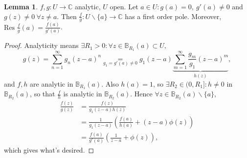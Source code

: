 \documentclass[a4paper]{article}
\theoremstyle{definition}
\newtheorem{lemma}[defn]{Lemma}
\begin{document}
\begin{lemma}
$f,g:U\rightarrow \mathbb C$ analytic, $U$ open. Let $a\in U:g(a)=0,\ g'(a)\neq 0$ and $g(z)\neq 0 \ \forall z\neq a$. Then $\frac{f}{g}:U\backslash\{a\} \rightarrow \mathbb C$ has a first order pole. Moreover, $\text{Res }\frac{f}{g}(a) = \frac{f(a)}{g'(a)}$.
\end{lemma}
\begin{proof}
Analyticity means $\exists R_1>0:\forall z\in \mathbb B_{R_1}(a) \subset U,$
\[
g(z) = \sum_{n=1}^\infty g_n(z-a)^n \underset{g_1=g'(a)\neq 0}{=} g_1 (z-a) \underbrace{\sum_{m=1}^\infty \frac{g_m}{g_1} (z-a)^m}_{h(z)},
\]
and $f,h$ are analytic in $\mathbb B_{R_1}(a)$. Also $h(a)=1$, so $\exists R_2\in (0,R_1]:h\neq 0$ in $\mathbb B_{R_2}(a)$, so that $\frac{f}{h}$ is analytic in $\mathbb B_{R_2}(a)$. Hence $\forall z\in \mathbb B_{R_2}(a) \backslash \{a\}$,
\[
\begin{aligned}
\frac{f(z)}{g(z)} &= \frac{f(z)}{g_1(z-a)h(z)} \\
&=\frac{1}{g_1(z-a)}\left( \frac{f(a)}{h(a)}+(z-a)\phi(z) \right) \\
&= \frac{f(a)}{g'(a)} \left(\frac{1}{z-a}+\phi(z)\right),
\end{aligned}
\]
which gives what's desired.
\end{proof}
\end{document}
